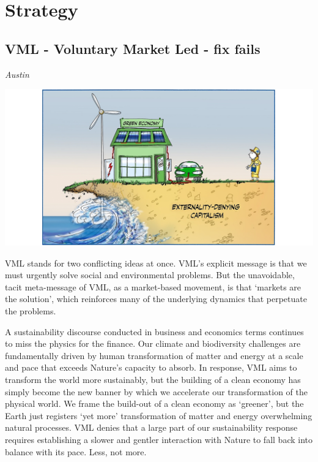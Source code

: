 \documentclass[
]{book}
\begin{document}
\hypertarget{strategy}{%
\section{Strategy}\label{strategy}}

\hypertarget{vml---voluntary-market-led---fix-fails}{%
\subsection{VML - Voluntary Market Led - fix fails}\label{vml---voluntary-market-led---fix-fails}}

\emph{Austin}

\includegraphics{fig/Market_Led _sustainability_is_a_fix_that_fails.png}

VML stands for two conflicting ideas at once. VML's explicit message is that we must urgently solve social and environmental problems. But the unavoidable, tacit meta-message of VML, as a market-based movement, is that `markets are the solution', which reinforces many of the underlying dynamics that perpetuate the problems.

A sustainability discourse conducted in business and economics terms continues to miss the physics for the finance. Our climate and biodiversity challenges are fundamentally driven by human transformation of matter and energy at a scale and pace that exceeds Nature's capacity to absorb. In response, VML aims to transform the world more sustainably, but the building of a clean economy has simply become the new banner by which we accelerate our transformation of the physical world. We frame the build-out of a clean economy as `greener', but the Earth just registers `yet more' transformation of matter and energy overwhelming natural processes. VML denies that a large part of our sustainability response requires establishing a slower and gentler interaction with Nature to fall back into balance with its pace. Less, not more.
\end{document}
